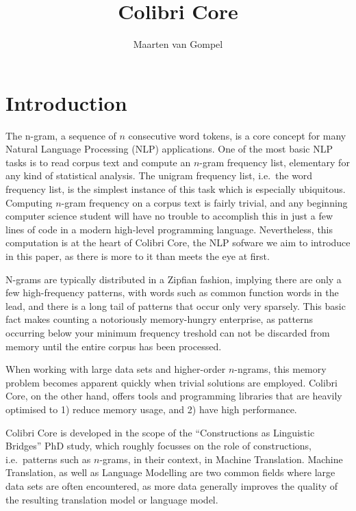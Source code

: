 \documentclass[review]{elsarticle}
\begin{document}
\begin{frontmatter}

\title{Colibri Core}
\author{Maarten van Gompel}

\end{frontmatter}

\linenumbers

\section{Introduction}

The n-gram, a sequence of $n$ consecutive word tokens, is a core concept for
many Natural Language Processing (NLP) applications. One of the most basic NLP
tasks is to read corpus text and compute an $n$-gram frequency list, elementary
for any kind of statistical analysis. The unigram frequency list, i.e.\ the word
frequency list, is the simplest instance of this task which is especially
ubiquitous. Computing $n$-gram frequency on a corpus text is fairly trivial,
and any beginning computer science student will have no trouble to accomplish
this in just a few lines of code in a modern high-level programming language.
Nevertheless, this computation is at the heart of Colibri Core, the NLP sofware
we aim to introduce in this paper, as there is more to it than meets the eye at
first.

N-grams are typically distributed in a Zipfian fashion, implying there are only
a few high-frequency patterns, with words such as common function words in the
lead, and there is a long tail of patterns that occur only very sparsely. This
basic fact makes counting a notoriously memory-hungry enterprise, as patterns
occurring below your minimum frequency treshold can not be discarded from
memory until the entire corpus has been processed. 

When working with large data sets and higher-order $n$-ngrams, this memory
problem becomes apparent quickly when trivial solutions are employed. Colibri
Core, on the other hand, offers tools and programming libraries that are
heavily optimised to 1) reduce memory usage, and 2) have high performance.

Colibri Core is developed in the scope of the ``Constructions as Linguistic
Bridges'' PhD study, which roughly focusses on the role of constructions, i.e.\ 
patterns such as $n$-grams, in their context, in Machine Translation. Machine
Translation, as well as Language Modelling are two common fields where large
data sets are often encountered, as more data generally improves the quality of
the resulting translation model or language model. 
\end{document}
